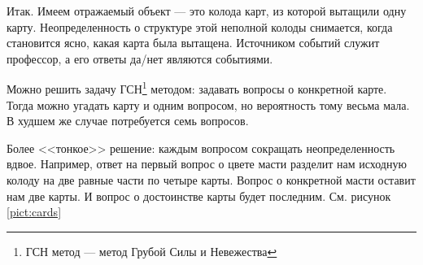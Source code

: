Итак. Имеем отражаемый объект --- это колода карт, из которой вытащили одну карту. Неопределенность о структуре этой неполной колоды снимается, когда становится ясно, какая карта была вытащена. Источником событий  служит профессор, а его ответы да/нет являются событиями.

Можно решить задачу ГСН\footnote{ГСН метод --- метод Грубой Силы и Невежества} методом: задавать вопросы о конкретной карте. Тогда можно угадать карту и одним вопросом, но вероятность тому весьма мала. В худшем же случае потребуется семь вопросов. 

Более <<тонкое>> решение: каждым вопросом сокращать неопределенность вдвое. Например, ответ на первый вопрос о цвете масти разделит нам исходную колоду на две равные части по четыре карты.  Вопрос о конкретной масти оставит нам две карты. И вопрос о достоинстве карты будет последним. См. рисунок \ref{pict:cards}

